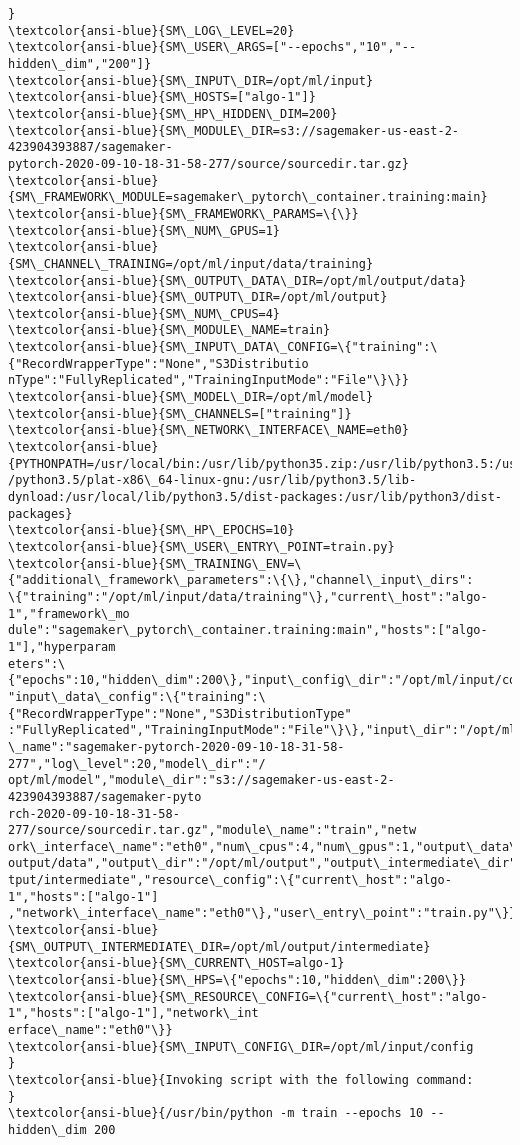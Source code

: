 \documentclass[11pt]{article}
\begin{document}
\begin{Verbatim}[commandchars=\\\{\}]
}
\textcolor{ansi-blue}{SM\_LOG\_LEVEL=20}
\textcolor{ansi-blue}{SM\_USER\_ARGS=["--epochs","10","--hidden\_dim","200"]}
\textcolor{ansi-blue}{SM\_INPUT\_DIR=/opt/ml/input}
\textcolor{ansi-blue}{SM\_HOSTS=["algo-1"]}
\textcolor{ansi-blue}{SM\_HP\_HIDDEN\_DIM=200}
\textcolor{ansi-blue}{SM\_MODULE\_DIR=s3://sagemaker-us-east-2-423904393887/sagemaker-
pytorch-2020-09-10-18-31-58-277/source/sourcedir.tar.gz}
\textcolor{ansi-blue}{SM\_FRAMEWORK\_MODULE=sagemaker\_pytorch\_container.training:main}
\textcolor{ansi-blue}{SM\_FRAMEWORK\_PARAMS=\{\}}
\textcolor{ansi-blue}{SM\_NUM\_GPUS=1}
\textcolor{ansi-blue}{SM\_CHANNEL\_TRAINING=/opt/ml/input/data/training}
\textcolor{ansi-blue}{SM\_OUTPUT\_DATA\_DIR=/opt/ml/output/data}
\textcolor{ansi-blue}{SM\_OUTPUT\_DIR=/opt/ml/output}
\textcolor{ansi-blue}{SM\_NUM\_CPUS=4}
\textcolor{ansi-blue}{SM\_MODULE\_NAME=train}
\textcolor{ansi-blue}{SM\_INPUT\_DATA\_CONFIG=\{"training":\{"RecordWrapperType":"None","S3Distributio
nType":"FullyReplicated","TrainingInputMode":"File"\}\}}
\textcolor{ansi-blue}{SM\_MODEL\_DIR=/opt/ml/model}
\textcolor{ansi-blue}{SM\_CHANNELS=["training"]}
\textcolor{ansi-blue}{SM\_NETWORK\_INTERFACE\_NAME=eth0}
\textcolor{ansi-blue}{PYTHONPATH=/usr/local/bin:/usr/lib/python35.zip:/usr/lib/python3.5:/usr/lib
/python3.5/plat-x86\_64-linux-gnu:/usr/lib/python3.5/lib-
dynload:/usr/local/lib/python3.5/dist-packages:/usr/lib/python3/dist-
packages}
\textcolor{ansi-blue}{SM\_HP\_EPOCHS=10}
\textcolor{ansi-blue}{SM\_USER\_ENTRY\_POINT=train.py}
\textcolor{ansi-blue}{SM\_TRAINING\_ENV=\{"additional\_framework\_parameters":\{\},"channel\_input\_dirs":
\{"training":"/opt/ml/input/data/training"\},"current\_host":"algo-1","framework\_mo
dule":"sagemaker\_pytorch\_container.training:main","hosts":["algo-1"],"hyperparam
eters":\{"epochs":10,"hidden\_dim":200\},"input\_config\_dir":"/opt/ml/input/config",
"input\_data\_config":\{"training":\{"RecordWrapperType":"None","S3DistributionType"
:"FullyReplicated","TrainingInputMode":"File"\}\},"input\_dir":"/opt/ml/input","job
\_name":"sagemaker-pytorch-2020-09-10-18-31-58-277","log\_level":20,"model\_dir":"/
opt/ml/model","module\_dir":"s3://sagemaker-us-east-2-423904393887/sagemaker-pyto
rch-2020-09-10-18-31-58-277/source/sourcedir.tar.gz","module\_name":"train","netw
ork\_interface\_name":"eth0","num\_cpus":4,"num\_gpus":1,"output\_data\_dir":"/opt/ml/
output/data","output\_dir":"/opt/ml/output","output\_intermediate\_dir":"/opt/ml/ou
tput/intermediate","resource\_config":\{"current\_host":"algo-1","hosts":["algo-1"]
,"network\_interface\_name":"eth0"\},"user\_entry\_point":"train.py"\}}
\textcolor{ansi-blue}{SM\_OUTPUT\_INTERMEDIATE\_DIR=/opt/ml/output/intermediate}
\textcolor{ansi-blue}{SM\_CURRENT\_HOST=algo-1}
\textcolor{ansi-blue}{SM\_HPS=\{"epochs":10,"hidden\_dim":200\}}
\textcolor{ansi-blue}{SM\_RESOURCE\_CONFIG=\{"current\_host":"algo-1","hosts":["algo-1"],"network\_int
erface\_name":"eth0"\}}
\textcolor{ansi-blue}{SM\_INPUT\_CONFIG\_DIR=/opt/ml/input/config
}
\textcolor{ansi-blue}{Invoking script with the following command:
}
\textcolor{ansi-blue}{/usr/bin/python -m train --epochs 10 --hidden\_dim 200


\end{Verbatim}
\end{document}
